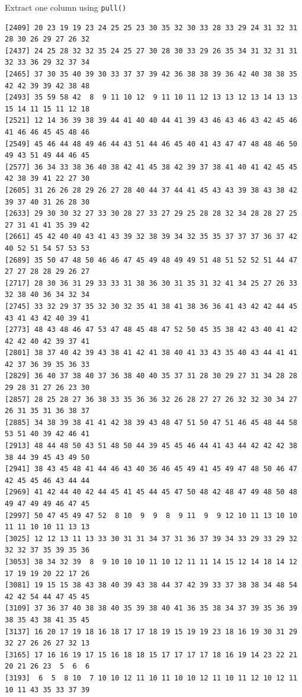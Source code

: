 \documentclass[
  ignorenonframetext,
  aspectratio=169,
]{beamer}
\let\oldtexttt\texttt
\renewcommand{\texttt}[1]{\colorbox{gray!20}{\oldtexttt{#1}}}
\begin{document}
\begin{frame}[fragile]{Extract one column using \texttt{pull()}}
\begin{verbatim}
[2409] 20 23 19 19 23 24 25 25 23 30 35 32 30 33 28 33 29 24 31 32 31 28 30 26 29 27 26 32
[2437] 24 25 28 32 32 35 24 25 27 30 28 30 33 29 26 35 34 31 32 31 31 32 33 36 29 32 37 34
[2465] 37 30 35 40 39 30 33 37 37 39 42 36 38 38 39 36 42 40 38 38 35 42 42 39 39 42 38 48
[2493] 35 59 58 42  8  9 11 10 12  9 11 10 11 12 13 13 12 13 14 13 13 15 14 11 15 11 12 18
[2521] 12 14 36 39 38 39 44 41 40 40 44 41 39 43 46 43 46 43 42 45 46 41 46 46 45 45 48 46
[2549] 45 46 44 48 49 46 44 43 51 44 46 45 40 41 43 47 47 48 48 46 50 49 43 51 49 44 46 45
[2577] 36 34 33 38 36 40 38 42 41 45 38 42 39 37 38 41 40 41 42 45 45 42 38 39 41 22 27 30
[2605] 31 26 26 28 29 26 27 28 40 44 37 44 41 45 43 43 39 38 43 38 42 39 37 40 31 26 28 30
[2633] 29 30 30 32 27 33 30 28 27 33 27 29 25 28 28 32 34 28 28 27 25 27 31 41 41 35 39 42
[2661] 45 42 40 40 43 41 43 39 32 38 39 34 32 35 35 37 37 37 36 37 42 40 52 51 54 57 53 53
[2689] 35 50 47 48 50 46 46 47 45 49 48 49 49 51 48 51 52 52 51 44 47 27 27 28 28 29 26 27
[2717] 28 30 36 31 29 33 33 31 38 36 30 31 35 31 32 41 34 25 27 26 33 32 38 40 36 34 32 34
[2745] 33 32 29 37 35 32 30 32 35 41 38 41 38 36 36 41 43 42 42 44 45 43 41 43 42 40 39 41
[2773] 48 43 48 46 47 53 47 48 45 48 47 52 50 45 35 38 42 43 40 41 42 42 42 40 42 39 37 41
[2801] 38 37 40 42 39 43 38 41 42 41 38 40 41 33 43 35 40 43 44 41 41 42 37 36 39 35 36 33
[2829] 36 40 37 38 40 37 36 38 40 40 35 37 31 28 30 29 27 31 34 28 28 29 28 31 27 26 23 30
[2857] 28 25 28 27 36 38 33 35 36 36 32 26 28 27 27 26 32 32 30 34 27 26 31 35 31 36 38 37
[2885] 34 38 39 38 41 41 42 38 39 43 48 47 51 50 47 51 46 45 48 44 58 53 51 40 39 42 46 41
[2913] 48 44 48 50 43 51 48 50 44 39 45 45 46 44 41 43 44 42 42 42 38 38 44 39 45 43 49 50
[2941] 38 43 45 48 41 44 46 43 40 36 46 45 49 41 45 49 47 48 50 46 47 42 45 45 46 43 44 44
[2969] 41 42 44 40 42 44 45 41 45 44 45 47 50 48 42 48 47 49 48 50 48 49 47 49 49 46 47 45
[2997] 50 47 45 49 47 52  8 10  9  9  8  9 11  9  9 12 10 11 13 10 10 11 11 10 10 11 13 13
[3025] 12 12 13 11 13 33 30 31 31 34 37 31 36 37 39 34 33 29 33 29 32 32 32 37 35 39 35 36
[3053] 38 34 32 39  8  9 10 10 10 11 10 12 11 11 14 15 12 14 18 14 12 17 19 19 20 22 17 26
[3081] 19 15 15 38 43 38 40 39 43 38 44 37 42 39 33 37 38 38 34 48 54 42 42 54 44 47 45 45
[3109] 37 36 37 40 38 38 40 35 39 38 40 41 36 35 38 34 37 39 35 36 39 38 35 43 38 41 35 45
[3137] 16 20 17 19 18 16 18 17 17 18 19 15 19 19 23 18 16 19 30 31 29 32 27 26 26 27 32 13
[3165] 17 16 16 19 17 15 16 18 18 15 17 17 17 17 18 16 19 14 23 22 21 20 21 26 23  5  6  6
[3193]  6  5  8 10  7 10 10 12 11 10 11 10 10 12 11 10 11 12 10 12 11 10 11 43 35 33 37 39

\end{verbatim}
\end{frame}
\end{document}
